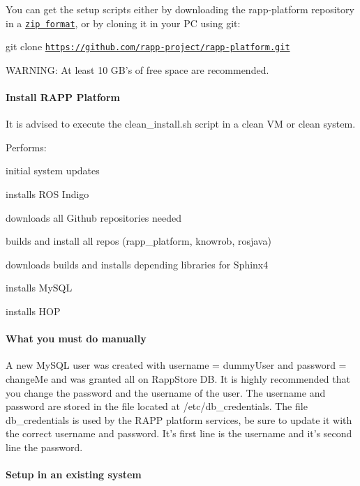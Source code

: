You can get the setup scripts either by downloading the rapp-\/platform repository in a \href{https://github.com/rapp-project/rapp-platform/zipball/master}{\tt zip format}, or by cloning it in your P\-C using git\-:

{\ttfamily git clone \href{https://github.com/rapp-project/rapp-platform.git}{\tt https\-://github.\-com/rapp-\/project/rapp-\/platform.\-git}}

W\-A\-R\-N\-I\-N\-G\-: At least 10 G\-B's of free space are recommended.

\paragraph*{Install R\-A\-P\-P Platform}

It is advised to execute the clean\-\_\-install.\-sh script in a clean V\-M or clean system.

Performs\-:
\begin{DoxyItemize}
\item initial system updates
\item installs R\-O\-S Indigo
\item downloads all Github repositories needed
\item builds and install all repos (rapp\-\_\-platform, knowrob, rosjava)
\item downloads builds and installs depending libraries for Sphinx4
\item installs My\-S\-Q\-L
\item installs H\-O\-P
\end{DoxyItemize}

\paragraph*{What you must do manually}

A new My\-S\-Q\-L user was created with username = {\ttfamily dummy\-User} and password = {\ttfamily change\-Me} and was granted all on Rapp\-Store D\-B. It is highly recommended that you change the password and the username of the user. The username and password are stored in the file located at /etc/db\-\_\-credentials. The file db\-\_\-credentials is used by the R\-A\-P\-P platform services, be sure to update it with the correct username and password. It's first line is the username and it's second line the password.

\paragraph*{Setup in an existing system}

